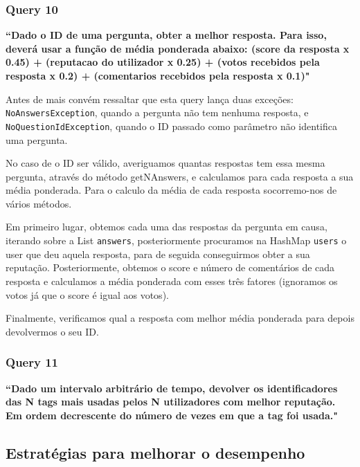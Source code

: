 \documentclass[a4paper]{article}
\begin{document}
\subsubsection*{Query 10}
\label{sec:query10}

\textbf{“Dado o ID de uma pergunta, obter a melhor resposta.
Para isso, deverá usar a função de média ponderada abaixo: (score da resposta x 0.45)
+ (reputacao do utilizador x 0.25) + (votos recebidos pela resposta x 0.2) +
(comentarios recebidos pela resposta x 0.1)"}\par

\vspace{0.1cm}

Antes de mais convém ressaltar que esta query lança duas exceções:
\texttt{NoAnswersException}, quando a pergunta não tem nenhuma resposta, e
\texttt{NoQuestionIdException}, quando o ID passado como parâmetro não identifica
uma pergunta.\par
No caso de o ID ser válido, averiguamos quantas respostas tem essa mesma pergunta,
através do método getNAnswers, e calculamos para cada resposta a sua média ponderada.
Para o calculo da média de cada resposta socorremo-nos de vários métodos.\par
Em primeiro lugar, obtemos cada uma das respostas da pergunta em causa, iterando
sobre a List \texttt{answers}, posteriormente procuramos na HashMap \texttt{users}
o user que deu aquela resposta, para de seguida conseguirmos obter a sua reputação.
Posteriormente, obtemos o score e número de comentários de cada resposta e calculamos
a média ponderada com esses três fatores (ignoramos os votos já que o score é
igual aos votos).\par
Finalmente, verificamos qual a resposta com melhor média ponderada para depois
devolvermos o seu ID.





\subsubsection*{Query 11}
\label{sec:query11}

\textbf{“Dado um intervalo arbitrário de tempo, devolver os identificadores das N tags
mais usadas pelos N utilizadores com melhor reputação. Em ordem decrescente do número
de vezes em que a tag foi usada."}

\vspace{0.1cm}

\subsection{Estratégias para melhorar o desempenho}
\label{sec:desempenho}
\end{document}
